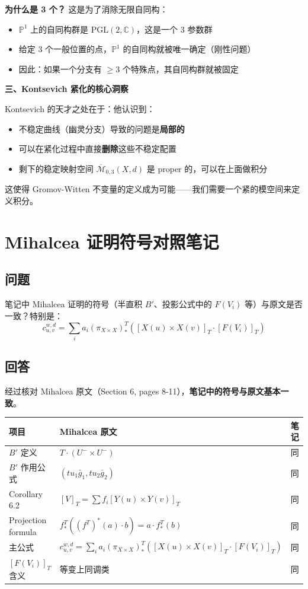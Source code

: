 \textbf{为什么是 3 个？} 这是为了消除无限自同构：
\begin{itemize}
\item $\mathbb{P}^1$ 上的自同构群是 $\mathrm{PGL}(2,\mathbb{C})$，这是一个 3 参数群
\item 给定 3 个一般位置的点，$\mathbb{P}^1$ 的自同构就被唯一确定（刚性问题）
\item 因此：如果一个分支有 $\geq 3$ 个特殊点，其自同构群就被固定
\end{itemize}

\textbf{三、Kontsevich 紧化的核心洞察}

Kontsevich 的天才之处在于：他认识到：
\begin{itemize}
\item 不稳定曲线（幽灵分支）导致的问题是\textbf{局部的}
\item 可以在紧化过程中直接\textbf{删除}这些不稳定配置
\item 剩下的稳定映射空间 $\overline{\mathcal{M}}_{0,3}(X,d)$ 是 proper 的，可以在上面做积分
\end{itemize}

这使得 Gromov-Witten 不变量的定义成为可能——我们需要一个紧的模空间来定义积分。

\section{Mihalcea 证明符号对照笔记}\label{sec:qa-mihalcea-notation}
\subsection{问题}
笔记中 Mihalcea 证明的符号（半直积 $B'$、投影公式中的 $F(V_i)$ 等）与原文是否一致？特别是：
$$c_{u, v}^{w, d}=\sum_i a_i\left(\pi_{X \times X}\right)_*^T\left([X(u) \times X(v)]_T\cdot\left[F\left(V_i\right)\right]_T\right)$$
\subsection{回答}
经过核对 Mihalcea 原文（Section 6, pages 8-11），\textbf{笔记中的符号与原文基本一致}。

\begin{center}
\begin{tabular}{l|l|c}
\hline
项目 & Mihalcea 原文 & 笔记 \\ \hline
$B'$ 定义 & $T \cdot (U^- \times U^-)$ & 同 \\
$B'$ 作用公式 & $(tu_1\bar{g}_1, tu_2\bar{g}_2)$ & 同 \\
Corollary 6.2 & $[V]_T = \sum f_i [Y(u) \times Y(v)]_T$ & 同 \\
Projection formula & $f_*^T((f^T)^*(a) \cdot b) = a \cdot f_*^T(b)$ & 同 \\
主公式 & $c_{u,v}^{w,d} = \sum_i a_i (\pi_{X \times X})_*^T([X(u) \times X(v)]_T \cdot [F(V_i)]_T)$ & 同 \\
$[F(V_i)]_T$ 含义 & 等变上同调类 & 同 \\ \hline
\end{tabular}
\end{center}

